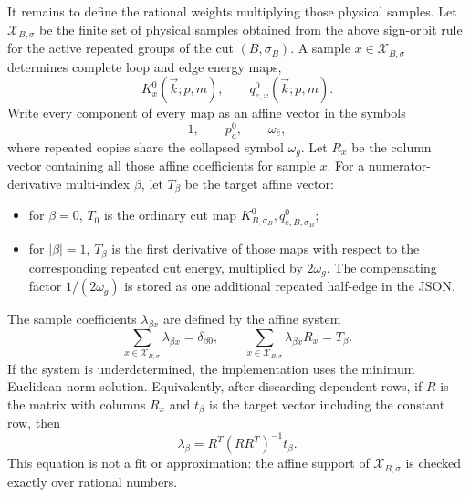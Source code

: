 \documentclass[11pt,a4paper]{report}
\newcommand{\Samples}{\mathcal X}
\begin{document}
It remains to define the rational weights multiplying those physical samples.
Let \(\Samples_{B,\sigma}\) be the finite set of physical samples obtained from
the above sign-orbit rule for the active repeated groups of the cut
\((B,\sigma_B)\).  A sample \(x\in\Samples_{B,\sigma}\) determines complete
loop and edge energy maps,
\[
  K_x^0(\vec k;p,m),\qquad q_{e,x}^0(\vec k;p,m).
\]
Write every component of every map as an affine vector in the symbols
\[
  1,\qquad p_a^0,\qquad \omega_{\bar e},
\]
where repeated copies share the collapsed symbol \(\omega_g\).  Let
\(R_x\) be the column vector containing all those affine coefficients for
sample \(x\).  For a numerator-derivative multi-index \(\beta\), let
\(T_\beta\) be the target affine vector:
\begin{itemize}[leftmargin=2em]
  \item for \(\beta=0\), \(T_0\) is the ordinary cut map
        \(K_{B,\sigma_B}^0,q_{e,B,\sigma_B}^0\);
  \item for \(|\beta|=1\), \(T_\beta\) is the first derivative of those maps
        with respect to the corresponding repeated cut energy, multiplied by
        \(2\omega_g\).  The compensating factor \(1/(2\omega_g)\) is stored as
        one additional repeated half-edge in the JSON.
\end{itemize}
The sample coefficients \(\lambda_{\beta x}\) are defined by the affine system
\begin{equation}
  \sum_{x\in\Samples_{B,\sigma}}\lambda_{\beta x}= \delta_{\beta0},
  \qquad
  \sum_{x\in\Samples_{B,\sigma}}\lambda_{\beta x} R_x=T_\beta.
  \label{eq:physical-affine-weights}
\end{equation}
If the system is underdetermined, the implementation uses the minimum Euclidean
norm solution.  Equivalently, after discarding dependent rows, if \(R\) is the
matrix with columns \(R_x\) and \(t_\beta\) is the target vector including the
constant row, then
\begin{equation}
  \lambda_\beta
  =
  R^{T}(RR^{T})^{-1}t_\beta .
  \label{eq:minnorm-affine-weights}
\end{equation}
This equation is not a fit or approximation: the affine support of
\(\Samples_{B,\sigma}\) is checked exactly over rational numbers.
\end{document}
